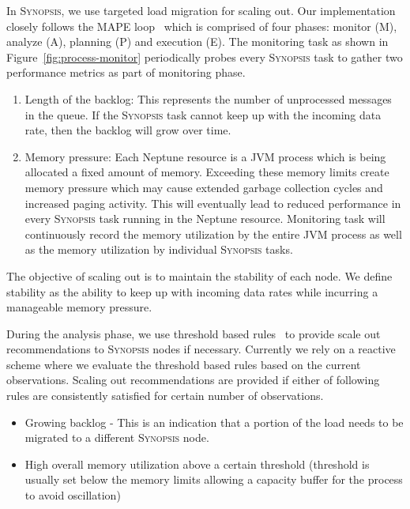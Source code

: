 In \textsc{Synopsis}, we use targeted load migration for scaling out.
Our implementation closely follows the MAPE loop~\cite{maurer2011revealing} which is comprised of four phases: monitor (M), analyze (A), planning (P) and execution (E).
The monitoring task as shown in Figure~\ref{fig:process-monitor} periodically probes every \textsc{Synopsis} task to gather two performance metrics as part of monitoring phase.
\begin{enumerate}[leftmargin=*]
	\item Length of the backlog: This represents the number of unprocessed messages in the queue. If the \textsc{Synopsis} task cannot keep up with the incoming data rate, then the backlog will grow over time.
	\item Memory pressure: Each Neptune resource is a JVM process which is being allocated a fixed amount of memory. 
	Exceeding these memory limits create memory pressure which may cause extended garbage collection cycles and increased paging activity. 
	This will eventually lead to reduced performance in every  \textsc{Synopsis} task running in the Neptune resource.
	Monitoring task will continuously record the memory utilization by the entire JVM process as well as the memory utilization by individual \textsc{Synopsis} tasks.
\end{enumerate} 

The objective of scaling out is to maintain the stability of each node.
We define stability as the ability to keep up with incoming data rates while incurring a manageable memory pressure.

During the analysis phase, we use threshold based rules~\cite{lorido2012auto} to provide scale out recommendations to \textsc{Synopsis} nodes if necessary.
Currently we rely on a reactive scheme where we evaluate the threshold based rules based on the current observations.
Scaling out recommendations are provided if either of following rules are consistently satisfied for certain number of observations.
\begin{itemize}[leftmargin=*]  
\item Growing backlog - This is an indication that a portion of the load needs to be migrated to a different \textsc{Synopsis} node.
\item High overall memory utilization above a certain threshold (threshold is usually set below the memory limits allowing a capacity buffer for the process to avoid oscillation)
\end{itemize}

